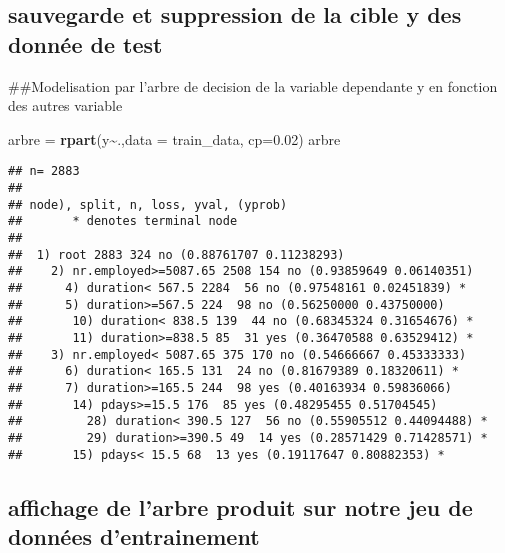 \documentclass[
]{article}
\newenvironment{Shaded}{\begin{snugshade}}{\end{snugshade}}
\newcommand{\AttributeTok}[1]{\textcolor[rgb]{0.13,0.29,0.53}{#1}}
\newcommand{\CommentTok}[1]{\textcolor[rgb]{0.56,0.35,0.01}{\textit{#1}}}
\newcommand{\FloatTok}[1]{\textcolor[rgb]{0.00,0.00,0.81}{#1}}
\newcommand{\FunctionTok}[1]{\textcolor[rgb]{0.13,0.29,0.53}{\textbf{#1}}}
\newcommand{\NormalTok}[1]{#1}
\newcommand{\OtherTok}[1]{\textcolor[rgb]{0.56,0.35,0.01}{#1}}
\newcommand{\SpecialCharTok}[1]{\textcolor[rgb]{0.81,0.36,0.00}{\textbf{#1}}}
\begin{document}
\hypertarget{sauvegarde-et-suppression-de-la-cible-y-des-donnuxe9e-de-test}{%
\subsection{sauvegarde et suppression de la cible y des donnée de
test}\label{sauvegarde-et-suppression-de-la-cible-y-des-donnuxe9e-de-test}}

\begin{Shaded}
\end{Shaded}

\#\#Modelisation par l'arbre de decision de la variable dependante y en
fonction des autres variable

\begin{Shaded}
\begin{Highlighting}[]
\NormalTok{arbre }\OtherTok{=} \FunctionTok{rpart}\NormalTok{(y}\SpecialCharTok{\textasciitilde{}}\NormalTok{.,}\AttributeTok{data =}\NormalTok{ train\_data, }\AttributeTok{cp=}\FloatTok{0.02}\NormalTok{)}
\NormalTok{arbre}
\end{Highlighting}
\end{Shaded}

\begin{verbatim}
## n= 2883 
## 
## node), split, n, loss, yval, (yprob)
##       * denotes terminal node
## 
##  1) root 2883 324 no (0.88761707 0.11238293)  
##    2) nr.employed>=5087.65 2508 154 no (0.93859649 0.06140351)  
##      4) duration< 567.5 2284  56 no (0.97548161 0.02451839) *
##      5) duration>=567.5 224  98 no (0.56250000 0.43750000)  
##       10) duration< 838.5 139  44 no (0.68345324 0.31654676) *
##       11) duration>=838.5 85  31 yes (0.36470588 0.63529412) *
##    3) nr.employed< 5087.65 375 170 no (0.54666667 0.45333333)  
##      6) duration< 165.5 131  24 no (0.81679389 0.18320611) *
##      7) duration>=165.5 244  98 yes (0.40163934 0.59836066)  
##       14) pdays>=15.5 176  85 yes (0.48295455 0.51704545)  
##         28) duration< 390.5 127  56 no (0.55905512 0.44094488) *
##         29) duration>=390.5 49  14 yes (0.28571429 0.71428571) *
##       15) pdays< 15.5 68  13 yes (0.19117647 0.80882353) *
\end{verbatim}

\hypertarget{affichage-de-larbre-produit-sur-notre-jeu-de-donnuxe9es-dentrainement}{%
\subsection{affichage de l'arbre produit sur notre jeu de données
d'entrainement}\label{affichage-de-larbre-produit-sur-notre-jeu-de-donnuxe9es-dentrainement}}
\end{document}
